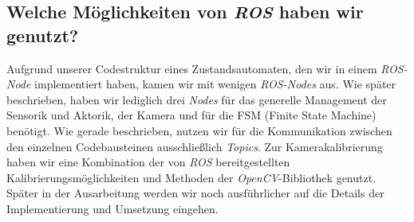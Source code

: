 \subsection{Welche Möglichkeiten von \textit{ROS} haben wir genutzt?}
Aufgrund unserer Codestruktur eines Zustandsautomaten, den wir in einem \textit{ROS-Node} implementiert haben, kamen wir mit wenigen \textit{ROS-Nodes} aus. Wie später beschrieben, haben wir lediglich drei \textit{Nodes} für das generelle Management der Sensorik und Aktorik, der Kamera und für die FSM (Finite State Machine) benötigt. Wie gerade beschrieben, nutzen wir für die Kommunikation zwischen den einzelnen Codebausteinen ausschließlich \textit{Topics}.
Zur Kamerakalibrierung haben wir eine Kombination der von \textit{ROS} bereitgestellten Kalibrierungsmöglichkeiten und Methoden der \textit{OpenCV}-Bibliothek genutzt. Später in der Ausarbeitung werden wir noch ausführlicher auf die Details der Implementierung und Umsetzung eingehen.  
